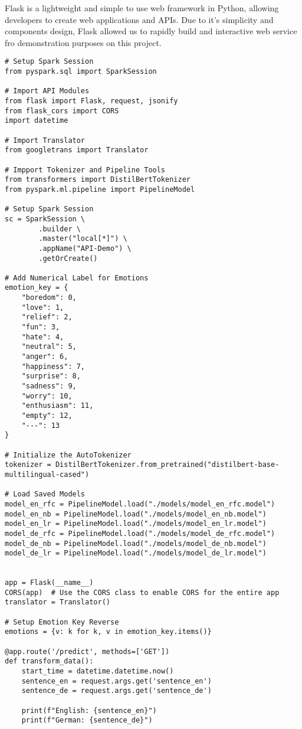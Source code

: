 Flask is a lightweight and simple to use web framework in Python, allowing developers to create web applications and APIs. Due to it's simplicity and components design, Flask allowed us to rapidly build and interactive web service fro demonstration purposes on this project.
\begin{verbatim}
# Setup Spark Session
from pyspark.sql import SparkSession

# Import API Modules 
from flask import Flask, request, jsonify
from flask_cors import CORS
import datetime

# Import Translator
from googletrans import Translator

# Impport Tokenizer and Pipeline Tools
from transformers import DistilBertTokenizer
from pyspark.ml.pipeline import PipelineModel

# Setup Spark Session
sc = SparkSession \
        .builder \
        .master("local[*]") \
        .appName("API-Demo") \
        .getOrCreate()

# Add Numerical Label for Emotions
emotion_key = {
    "boredom": 0,
    "love": 1,
    "relief": 2,
    "fun": 3,
    "hate": 4,
    "neutral": 5,
    "anger": 6,
    "happiness": 7,
    "surprise": 8,
    "sadness": 9,
    "worry": 10,
    "enthusiasm": 11,
    "empty": 12,
    "---": 13
}

# Initialize the AutoTokenizer
tokenizer = DistilBertTokenizer.from_pretrained("distilbert-base-multilingual-cased")

# Load Saved Models
model_en_rfc = PipelineModel.load("./models/model_en_rfc.model")
model_en_nb = PipelineModel.load("./models/model_en_nb.model")
model_en_lr = PipelineModel.load("./models/model_en_lr.model")
model_de_rfc = PipelineModel.load("./models/model_de_rfc.model")
model_de_nb = PipelineModel.load("./models/model_de_nb.model")
model_de_lr = PipelineModel.load("./models/model_de_lr.model")


app = Flask(__name__)
CORS(app)  # Use the CORS class to enable CORS for the entire app
translator = Translator()

# Setup Emotion Key Reverse
emotions = {v: k for k, v in emotion_key.items()}

@app.route('/predict', methods=['GET'])
def transform_data():
    start_time = datetime.datetime.now()
    sentence_en = request.args.get('sentence_en')
    sentence_de = request.args.get('sentence_de')
    
    print(f"English: {sentence_en}")
    print(f"German: {sentence_de}")
    

\end{verbatim}
